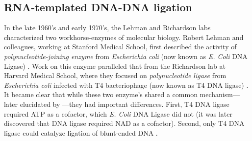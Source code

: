   \subsection{RNA-templated DNA-DNA ligation}
    \label{Intro:subsec:Ligation}

    In the late 1960's and early 1970's, the Lehman and Richardson labs characterized two workhorse-enzymes of molecular biology. Robert Lehman and colleagues, working at Stanford Medical School, first described the activity of \textit{polynucleotide-joining enzyme} from \textit{Escherichia coli} (now known as \textit{E. Coli} DNA Ligase) \citep{Olivera1967b}. Work on this enzyme paralleled that from the Richardson lab at Harvard Medical School, where they focused on \textit{polynucleotide ligase} from \textit{Escherichia coli} infected with T4 bacteriophage (now known as T4 DNA ligase) \citep{Weiss1967a}. It became clear that while these two enzyme's shared a common mechanism---later elucidated by \citet{Modrich1973a}---they had important differences. First, T4 DNA ligase required ATP as a cofactor, which \textit{E. Coli} DNA Ligase did not (it was later discovered that DNA ligase required NAD as a cofactor). Second, only T4 DNA ligase could catalyze ligation of blunt-ended DNA \citep{Tabor1987a}.

